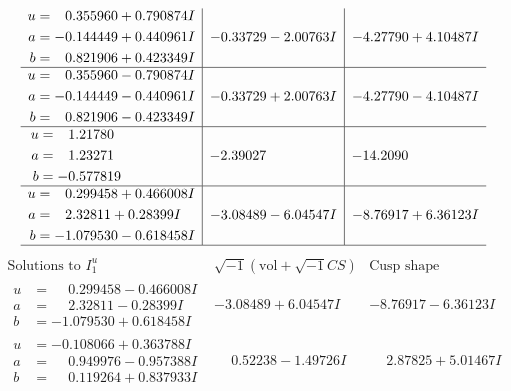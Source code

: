 \documentclass[1p]{elsarticle_modified}
\theoremstyle{definition}
\newcommand{\I}{\sqrt{-1}}
\begin{document}
$$\begin{array}{c|c|c}
\begin{aligned}
u &= \phantom{-}0.355960 + 0.790874 I \\
a &= -0.144449 + 0.440961 I \\
b &= \phantom{-}0.821906 + 0.423349 I\end{aligned}
 & -0.33729 - 2.00763 I & -4.27790 + 4.10487 I \\ \hline\begin{aligned}
u &= \phantom{-}0.355960 - 0.790874 I \\
a &= -0.144449 - 0.440961 I \\
b &= \phantom{-}0.821906 - 0.423349 I\end{aligned}
 & -0.33729 + 2.00763 I & -4.27790 - 4.10487 I \\ \hline\begin{aligned}
u &= \phantom{-}1.21780\phantom{ +0.000000I} \\
a &= \phantom{-}1.23271\phantom{ +0.000000I} \\
b &= -0.577819\phantom{ +0.000000I}\end{aligned}
 & -2.39027\phantom{ +0.000000I} & -14.2090\phantom{ +0.000000I} \\ \hline\begin{aligned}
u &= \phantom{-}0.299458 + 0.466008 I \\
a &= \phantom{-}2.32811 + 0.28399 I \\
b &= -1.079530 - 0.618458 I\end{aligned}
 & -3.08489 - 6.04547 I & -8.76917 + 6.36123 I\\
 \hline 
 \end{array}$$\newpage$$\begin{array}{c|c|c}  
\text{Solutions to }I^u_{1}& \I (\text{vol} + \sqrt{-1}CS) & \text{Cusp shape}\\
 \hline 
\begin{aligned}
u &= \phantom{-}0.299458 - 0.466008 I \\
a &= \phantom{-}2.32811 - 0.28399 I \\
b &= -1.079530 + 0.618458 I\end{aligned}
 & -3.08489 + 6.04547 I & -8.76917 - 6.36123 I \\ \hline\begin{aligned}
u &= -0.108066 + 0.363788 I \\
a &= \phantom{-}0.949976 - 0.957388 I \\
b &= \phantom{-}0.119264 + 0.837933 I\end{aligned}
 & \phantom{-}0.52238 - 1.49726 I & \phantom{-}2.87825 + 5.01467 I \\ \hline\begin{aligned}

\end{aligned}
\end{array}$$
\end{document}
